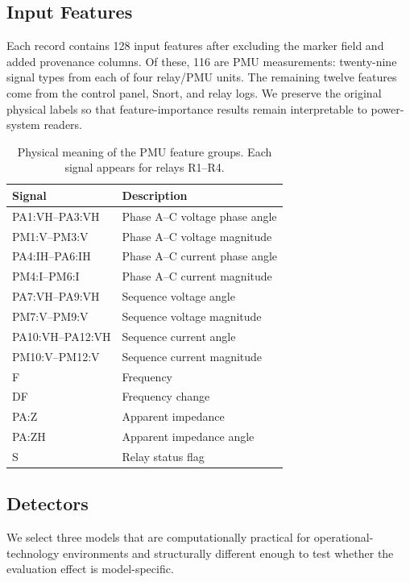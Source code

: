 \documentclass[conference,a4paper]{IEEEtran}
\begin{document}
\subsection{Input Features}

Each record contains 128 input features after excluding the marker field and added provenance columns. Of these, 116 are PMU measurements: twenty-nine signal types from each of four relay/PMU units. The remaining twelve features come from the control panel, Snort, and relay logs. We preserve the original physical labels so that feature-importance results remain interpretable to power-system readers.

\begin{table}[htbp]
\caption{Physical meaning of the PMU feature groups. Each signal appears for relays R1--R4.}
\label{tab:features}
\centering
\scriptsize
\setlength{\tabcolsep}{4pt}
\begin{tabular*}{\columnwidth}{@{\extracolsep{\fill}}p{}p{}}
\toprule
\textbf{Signal} & \textbf{Description} \\
\midrule
PA1:VH--PA3:VH & Phase A--C voltage phase angle \\
PM1:V--PM3:V & Phase A--C voltage magnitude \\
PA4:IH--PA6:IH & Phase A--C current phase angle \\
PM4:I--PM6:I & Phase A--C current magnitude \\
PA7:VH--PA9:VH & Sequence voltage angle \\
PM7:V--PM9:V & Sequence voltage magnitude \\
PA10:VH--PA12:VH & Sequence current angle \\
PM10:V--PM12:V & Sequence current magnitude \\
F & Frequency \\
DF & Frequency change \\
PA:Z & Apparent impedance \\
PA:ZH & Apparent impedance angle \\
S & Relay status flag \\
\bottomrule
\end{tabular*}
\end{table}

\subsection{Detectors}

We select three models that are computationally practical for operational-technology environments and structurally different enough to test whether the evaluation effect is model-specific.
\end{document}

